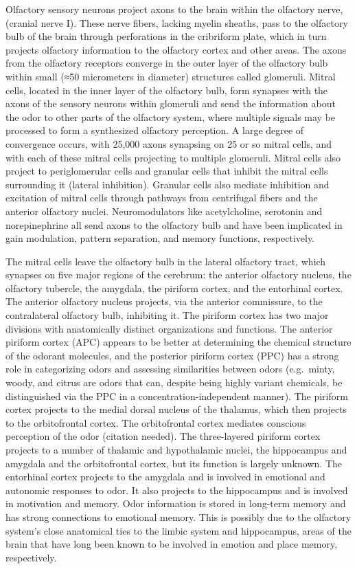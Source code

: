 Olfactory sensory neurons project axons to the brain within the
olfactory nerve, (cranial nerve I). These nerve fibers, lacking myelin
sheaths, pass to the olfactory bulb of the brain through perforations in
the cribriform plate, which in turn projects olfactory information to
the olfactory cortex and other areas. The axons from the olfactory
receptors converge in the outer layer of the olfactory bulb within small
(≈50 micrometers in diameter) structures called glomeruli. Mitral cells,
located in the inner layer of the olfactory bulb, form synapses with the
axons of the sensory neurons within glomeruli and send the information
about the odor to other parts of the olfactory system, where multiple
signals may be processed to form a synthesized olfactory perception. A
large degree of convergence occurs, with 25,000 axons synapsing on 25 or
so mitral cells, and with each of these mitral cells projecting to
multiple glomeruli. Mitral cells also project to periglomerular cells
and granular cells that inhibit the mitral cells surrounding it (lateral
inhibition). Granular cells also mediate inhibition and excitation of
mitral cells through pathways from centrifugal fibers and the anterior
olfactory nuclei. Neuromodulators like acetylcholine, serotonin and
norepinephrine all send axons to the olfactory bulb and have been
implicated in gain modulation, pattern separation, and memory functions,
respectively.

The mitral cells leave the olfactory bulb in the lateral olfactory
tract, which synapses on five major regions of the cerebrum: the
anterior olfactory nucleus, the olfactory tubercle, the amygdala, the
piriform cortex, and the entorhinal cortex. The anterior olfactory
nucleus projects, via the anterior commissure, to the contralateral
olfactory bulb, inhibiting it. The piriform cortex has two major
divisions with anatomically distinct organizations and functions. The
anterior piriform cortex (APC) appears to be better at determining the
chemical structure of the odorant molecules, and the posterior piriform
cortex (PPC) has a strong role in categorizing odors and assessing
similarities between odors (e.g.~minty, woody, and citrus are odors that
can, despite being highly variant chemicals, be distinguished via the
PPC in a concentration-independent manner). The piriform cortex projects
to the medial dorsal nucleus of the thalamus, which then projects to the
orbitofrontal cortex. The orbitofrontal cortex mediates conscious
perception of the odor (citation needed). The three-layered piriform
cortex projects to a number of thalamic and hypothalamic nuclei, the
hippocampus and amygdala and the orbitofrontal cortex, but its function
is largely unknown. The entorhinal cortex projects to the amygdala and
is involved in emotional and autonomic responses to odor. It also
projects to the hippocampus and is involved in motivation and memory.
Odor information is stored in long-term memory and has strong
connections to emotional memory. This is possibly due to the olfactory
system's close anatomical ties to the limbic system and hippocampus,
areas of the brain that have long been known to be involved in emotion
and place memory, respectively.

